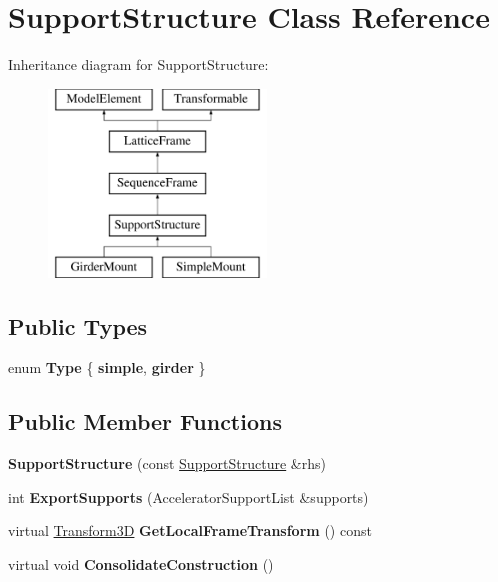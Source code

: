 \hypertarget{classSupportStructure}{}\section{Support\+Structure Class Reference}
\label{classSupportStructure}
Inheritance diagram for Support\+Structure\+:\begin{figure}[H]
\begin{center}
\leavevmode
\includegraphics[height=5.000000cm]{classSupportStructure}
\end{center}
\end{figure}
\subsection*{Public Types}
\begin{DoxyCompactItemize}
\item 
\mbox{\label{classSupportStructure_ac86c97002b23f3956d07266153b9da15}} 
enum {\bfseries Type} \{ {\bfseries simple}, 
{\bfseries girder}
 \}
\end{DoxyCompactItemize}
\subsection*{Public Member Functions}
\begin{DoxyCompactItemize}
\item 
\mbox{\label{classSupportStructure_aa168e362b05301e569ab4650375f20dd}} 
{\bfseries Support\+Structure} (const \hyperlink{classSupportStructure}{Support\+Structure} \&rhs)
\item 
\mbox{\label{classSupportStructure_a25a8fe3a55685af5bcc02537e8003493}} 
int {\bfseries Export\+Supports} (Accelerator\+Support\+List \&supports)
\item 
\mbox{\label{classSupportStructure_a7072ed11ae2df141daf330c7d99dc24a}} 
virtual \hyperlink{classTransform3D}{Transform3D} {\bfseries Get\+Local\+Frame\+Transform} () const
\item 
\mbox{\label{classSupportStructure_a14735d12a67f878edb7ab516e96ee0b2}} 
virtual void {\bfseries Consolidate\+Construction} ()
\end{DoxyCompactItemize}
